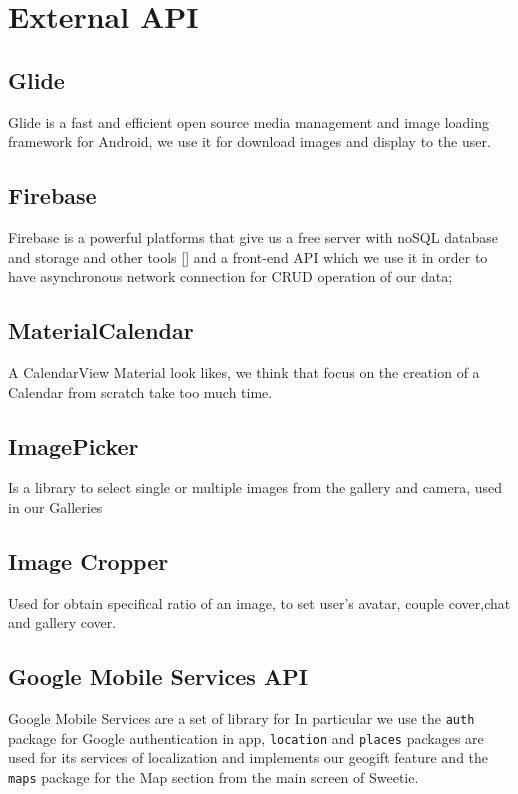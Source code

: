 
\section{External API}
\label{sec:ext_api} 

\subsection{Glide}
Glide is a fast and efficient open source media management and image loading framework for Android, we use it for download images and display to the user.

\subsection{Firebase}
Firebase is a powerful platforms that give us a free server with noSQL database and storage and other tools [] and a front-end API which we use it in order to have asynchronous network connection for CRUD operation of our data;

\subsection{MaterialCalendar}
A CalendarView Material look likes, we think that focus on the creation of a Calendar from scratch take too much time.

\subsection{ImagePicker}
Is a library to select single or multiple images from the gallery and camera, used in our Galleries 

\subsection{Image Cropper}
Used for obtain specifical ratio of an image, to set user's avatar, couple cover,chat and gallery cover.

\subsection{Google Mobile Services API}
Google Mobile Services are a set of library for In particular we use the \texttt{auth} package for Google authentication in app, \texttt{location} and \texttt{places} packages are used for its services of localization and implements our geogift feature and the \texttt{maps} package for the Map section from the main screen of Sweetie.